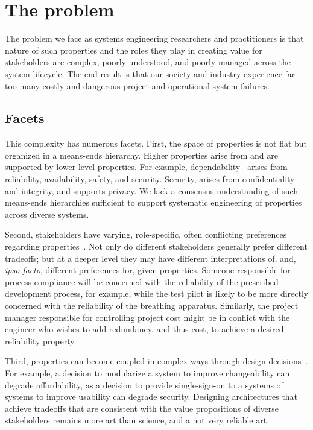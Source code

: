 \documentclass[conference]{IEEEtran}
\begin{document}

\section{The problem}

The problem we face as systems engineering researchers and practitioners is that nature of such properties and the roles they play in creating value for stakeholders are complex, poorly understood, and poorly managed across the system lifecycle. The end result is that our society and industry experience far too many costly and dangerous project and operational system failures. 

\subsection{Facets}
This complexity has numerous facets. First, the space of properties is not flat but organized in a means-ends hierarchy. Higher properties arise from and are supported by lower-level properties. For example, dependability~\cite{Laprie:dependability} arises from reliability, availability, safety, and security. Security, arises from confidentiality and integrity, and supports privacy. We lack a consensus understanding of such means-ends hierarchies sufficient to support systematic engineering of properties across diverse systems.

Second, stakeholders have varying, role-specific, often conflicting preferences regarding properties~\cite{Boehm:ontology}. Not only do different stakeholders generally prefer different tradeoffs; but at a deeper level they may have different interpretations of, and, {\em ipso facto}, different preferences for, given properties. Someone responsible for process compliance will be concerned with the reliability of the prescribed development process, for example, while the test pilot is likely to be more directly concerned with the reliability of the breathing apparatus. Similarly, the project manager responsible for controlling project cost might be in conflict with the engineer who wishes to add redundancy, and thus cost, to achieve a desired reliability property.

Third, properties can become coupled in complex ways through design decisions~\cite{suh, boehm-cser-2015-paper}. For example, a decision to modularize a system to improve changeability can degrade affordability, as a decision to provide single-sign-on to a systems of systems to improve usability can degrade security. Designing architectures that achieve tradeoffs that are consistent with the value propositions of diverse stakeholders remains more art than science, and a not very reliable art.
\end{document}
